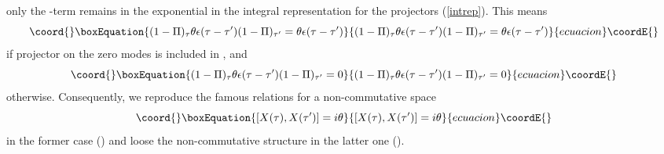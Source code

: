 \documentclass[a4paper,12pt,twoside]{article}
\begin{document}
only the \myHighlight{$\mu$}\coordHE{}-term remains in the exponential
in the integral representation for the projectors (\ref{intrep}). 
This means
\begin{equation}\coord{}\boxEquation{
(1-\Pi )_\tau \theta \epsilon (\tau -\tau') (1-\Pi )_{\tau'}=
\theta \epsilon (\tau -\tau') \label{1616}
}{
(1-\Pi )_\tau \theta \epsilon (\tau -\tau') (1-\Pi )_{\tau'}=
\theta \epsilon (\tau -\tau') }{ecuacion}\coordE{}\end{equation}
if projector on the zero modes \coordHE{} is included in \coordHE{},
and
\begin{equation}\coord{}\boxEquation{
(1-\Pi )_\tau \theta \epsilon (\tau -\tau') (1-\Pi )_{\tau'}=0
\label{1617}
}{
(1-\Pi )_\tau \theta \epsilon (\tau -\tau') (1-\Pi )_{\tau'}=0
}{ecuacion}\coordE{}\end{equation}
otherwise. Consequently, we reproduce the famous relations for
a non-commutative space \cite{Schomerus:1999ug,Seiberg:1999vs}
\begin{equation}\coord{}\boxEquation{
[X(\tau),X(\tau')]=i\theta \label{noncom}
}{
[X(\tau),X(\tau')]=i\theta }{ecuacion}\coordE{}\end{equation}
in the former case (\coordHE{}) and loose the non-commutative
structure in the latter one (\coordHE{}). 
\end{document}
